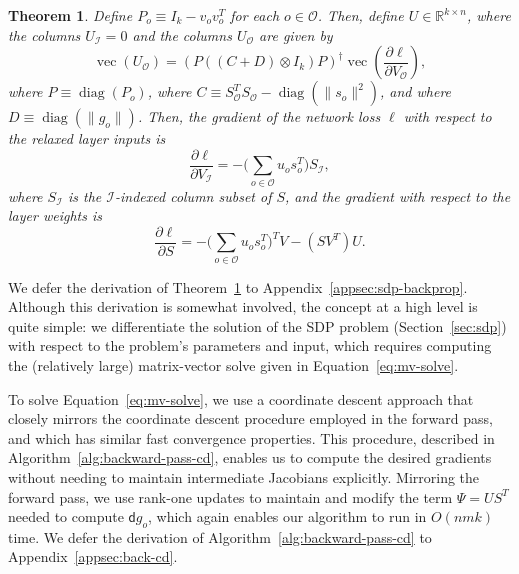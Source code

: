 \documentclass{article}
\newtheorem{theorem}{Theorem}
\DeclareMathOperator{\diag}{diag}
\DeclareMathOperator{\vect}{vec}
\newcommand{\norm}[1] {\|#1\|}
\newcommand{\dd}{\mathsf{d}}
\newcommand{\outdex}{o}
\newcommand{\inset}{\mathcal{I}}
\newcommand{\outset}{\mathcal{O}}
\begin{document}
	\begin{theorem}
		Define $P_{\outdex} \equiv I_k-v_{\outdex} v_{\outdex}^T$ for each $\outdex \in \outset$. Then, define $U \in \mathbb{R}^{k \times n}$, where the columns $U_{\inset} = 0$ and the columns $U_{\outset}$ are given by
		\begin{equation}
			\vect(U_{\outset})=  \left(P((C+D)\otimes I_k)P\right)^\dagger\vect\left(\frac{\partial \ell}{\partial V_{\outset}}\right),
			\label{eq:mv-solve}
		\end{equation}
	    where $P \equiv \diag(P_\outdex)$, where $C\equiv S_{\outset}^TS_{\outset}-\diag(\norm{s_{\outdex}}^2)$, and where $D \equiv \diag(\|g_{\outdex}\|)$. 
Then, the gradient of the network loss $\ell$ with respect to the relaxed layer inputs is
		\begin{equation}
			\frac{\partial \ell}{\partial V_{\inset}} = -\Big(\sum_{\outdex \in \outset} u_{\outdex} s_{\outdex}^T \Big)S_{\inset}, \label{eq:dl-dvin-main}
		\end{equation}
	where $S_{\inset}$ is the $\inset$-indexed column subset of $S$, and the gradient with respect to the layer weights is
		\begin{equation}
			\frac{\partial \ell}{\partial S} = -\Big(\sum_{\outdex \in \outset} u_{\outdex} s_{\outdex}^T \Big)^TV - (SV^T)U. \label{eq:dl-ds-main}
		\end{equation}
		\label{thm:back-grads}
	\end{theorem}
	
	We defer the derivation of Theorem~\ref{thm:back-grads} to Appendix~\ref{appsec:sdp-backprop}.
	Although this derivation is somewhat involved, the concept at a high level is quite simple: we differentiate the solution of the SDP problem (Section~\ref{sec:sdp}) with respect to the problem's parameters and input, which requires computing the (relatively large) matrix-vector solve given in Equation~\eqref{eq:mv-solve}. 
	
	To solve Equation~\eqref{eq:mv-solve}, we use a coordinate descent approach that closely mirrors the coordinate descent procedure employed in the forward pass, and which has similar fast convergence properties.
This procedure, described in Algorithm~\ref{alg:backward-pass-cd}, 
enables us to compute the desired gradients without needing to maintain intermediate Jacobians explicitly.
Mirroring the forward pass, we use rank-one updates to maintain and modify the term $\Psi = U S^T$ needed to compute $\dd g_{\outdex}$, which again enables our algorithm to run in $O(nmk)$ time.
	We defer the derivation of Algorithm~\ref{alg:backward-pass-cd} to Appendix~\ref{appsec:back-cd}.
	
\end{document}
